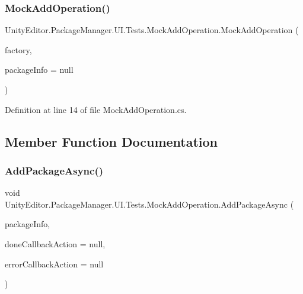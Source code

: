 \subsubsection{\texorpdfstring{MockAddOperation()}{MockAddOperation()}}
{\footnotesize\ttfamily Unity\+Editor.\+Package\+Manager.\+U\+I.\+Tests.\+Mock\+Add\+Operation.\+Mock\+Add\+Operation (\begin{DoxyParamCaption}\item[{\mbox{\hyperlink{class_unity_editor_1_1_package_manager_1_1_u_i_1_1_tests_1_1_mock_operation_factory}{Mock\+Operation\+Factory}}}]{factory,  }\item[{\mbox{\hyperlink{class_unity_editor_1_1_package_manager_1_1_u_i_1_1_package_info}{Package\+Info}}}]{package\+Info = {\ttfamily null} }\end{DoxyParamCaption})}



Definition at line 14 of file Mock\+Add\+Operation.\+cs.



\subsection{Member Function Documentation}
\mbox{\label{class_unity_editor_1_1_package_manager_1_1_u_i_1_1_tests_1_1_mock_add_operation_aab0d0a956f90a3496b0a5cba30cdd2b7}} 
\subsubsection{\texorpdfstring{AddPackageAsync()}{AddPackageAsync()}}
{\footnotesize\ttfamily void Unity\+Editor.\+Package\+Manager.\+U\+I.\+Tests.\+Mock\+Add\+Operation.\+Add\+Package\+Async (\begin{DoxyParamCaption}\item[{\mbox{\hyperlink{class_unity_editor_1_1_package_manager_1_1_u_i_1_1_package_info}{Package\+Info}}}]{package\+Info,  }\item[{Action$<$ \mbox{\hyperlink{class_unity_editor_1_1_package_manager_1_1_u_i_1_1_package_info}{Package\+Info}} $>$}]{done\+Callback\+Action = {\ttfamily null},  }\item[{Action$<$ Error $>$}]{error\+Callback\+Action = {\ttfamily null} }\end{DoxyParamCaption})}



